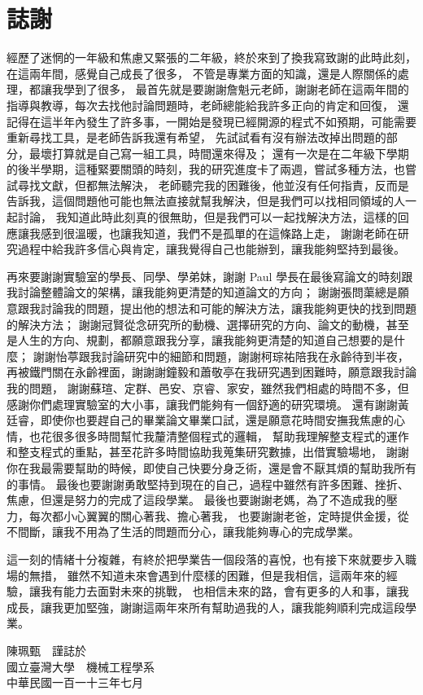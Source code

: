 \chapter{誌謝}
    \fontsize{12pt}{18pt}\selectfont
    經歷了迷惘的一年級和焦慮又緊張的二年級，終於來到了換我寫致謝的此時此刻，在這兩年間，感覺自己成長了很多，
    不管是專業方面的知識，還是人際關係的處理，都讓我學到了很多，
    最首先就是要謝謝詹魁元老師，謝謝老師在這兩年間的指導與教導，每次去找他討論問題時，老師總能給我許多正向的肯定和回復，
    還記得在這半年內發生了許多事，一開始是發現已經開源的程式不如預期，可能需要重新尋找工具，是老師告訴我還有希望，
    先試試看有沒有辦法改掉出問題的部分，最壞打算就是自己寫一組工具，時間還來得及；
    還有一次是在二年級下學期的後半學期，這種緊要關頭的時刻，我的研究進度卡了兩週，嘗試多種方法，也嘗試尋找文獻，但都無法解決，
    老師聽完我的困難後，他並沒有任何指責，反而是告訴我，這個問題他可能也無法直接就幫我解決，但是我們可以找相同領域的人一起討論，
    我知道此時此刻真的很無助，但是我們可以一起找解決方法，這樣的回應讓我感到很溫暖，也讓我知道，我們不是孤單的在這條路上走，
    謝謝老師在研究過程中給我許多信心與肯定，讓我覺得自己也能辦到，讓我能夠堅持到最後。

    再來要謝謝實驗室的學長、同學、學弟妹，謝謝 Paul 學長在最後寫論文的時刻跟我討論整體論文的架構，讓我能夠更清楚的知道論文的方向；
    謝謝張問蕖總是願意跟我討論我的問題，提出他的想法和可能的解決方法，讓我能夠更快的找到問題的解決方法；
    謝謝冠賢從念研究所的動機、選擇研究的方向、論文的動機，甚至是人生的方向、規劃，都願意跟我分享，讓我能夠更清楚的知道自己想要的是什麼；
    謝謝怡葶跟我討論研究中的細節和問題，謝謝柯琮祐陪我在永齡待到半夜，再被鐵門關在永齡裡面，謝謝謝鐘毅和蕭敬亭在我研究遇到困難時，願意跟我討論我的問題，
    謝謝蘇瑄、定群、邑安、京睿、家安，雖然我們相處的時間不多，但感謝你們處理實驗室的大小事，讓我們能夠有一個舒適的研究環境。
    還有謝謝黃廷睿，即使你也要趕自己的畢業論文畢業口試，還是願意花時間安撫我焦慮的心情，也花很多很多時間幫忙我釐清整個程式的邏輯，
    幫助我理解整支程式的運作和整支程式的重點，甚至花許多時間協助我蒐集研究數據，出借實驗場地，
    謝謝你在我最需要幫助的時候，即使自己快要分身乏術，還是會不厭其煩的幫助我所有的事情。
    最後也要謝謝勇敢堅持到現在的自己，過程中雖然有許多困難、挫折、焦慮，但還是努力的完成了這段學業。
    最後也要謝謝老媽，為了不造成我的壓力，每次都小心翼翼的關心著我、擔心著我，
    也要謝謝老爸，定時提供金援，從不間斷，讓我不用為了生活的問題而分心，讓我能夠專心的完成學業。
    
    這一刻的情緒十分複雜，有終於把學業告一個段落的喜悅，也有接下來就要步入職場的無措，
    雖然不知道未來會遇到什麼樣的困難，但是我相信，這兩年來的經驗，讓我有能力去面對未來的挑戰，
    也相信未來的路，會有更多的人和事，讓我成長，讓我更加堅強，謝謝這兩年來所有幫助過我的人，讓我能夠順利完成這段學業。

    \begin{flushright}
        陳珮甄　謹誌於\\
        國立臺灣大學　機械工程學系\\
        中華民國一百一十三年七月
    \end{flushright}
 
